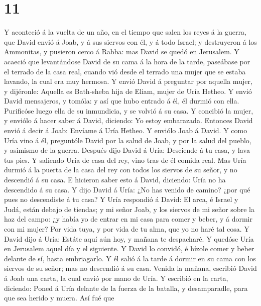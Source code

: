 \hypertarget{section-10}{%
\section{11}\label{section-10}}

 Y aconteció á la vuelta de un año, en el tiempo que salen
los reyes á la guerra, que David envió á Joab, y á sus siervos con él, y
á todo Israel; y destruyeron á los Ammonitas, y pusieron cerco á Rabba:
mas David se quedó en Jerusalem.  Y acaeció que levantándose
David de su cama á la hora de la tarde, paseábase por el terrado de la
casa real, cuando vió desde el terrado una mujer que se estaba lavando,
la cual era muy hermosa.  Y envió David á preguntar por
aquella mujer, y dijéronle: Aquella es Bath-sheba hija de Eliam, mujer
de Uría Hetheo.  Y envió David mensajeros, y tomóla: y así
que hubo entrado á él, él durmió con ella. Purificóse luego ella de su
inmundicia, y se volvió á su casa.  Y concibió la mujer, y
enviólo á hacer saber á David, diciendo: Yo estoy embarazada.
 Entonces David envió á decir á Joab: Envíame á Uría Hetheo.
Y enviólo Joab á David.  Y como Uría vino á él, preguntóle
David por la salud de Joab, y por la salud del pueblo, y asimismo de la
guerra.  Después dijo David á Uría: Desciende á tu casa, y
lava tus pies. Y saliendo Uría de casa del rey, vino tras de él comida
real.  Mas Uría durmió á la puerta de la casa del rey con
todos los siervos de su señor, y no descendió á su casa.  E
hicieron saber esto á David, diciendo: Uría no ha descendido á su casa.
Y dijo David á Uría: ¿No has venido de camino? ¿por qué pues no
descendiste á tu casa?  Y Uría respondió á David: El arca,
é Israel y Judá, están debajo de tiendas; y mi señor Joab, y los siervos
de mi señor sobre la haz del campo: ¿y había yo de entrar en mi casa
para comer y beber, y á dormir con mi mujer? Por vida tuya, y por vida
de tu alma, que yo no haré tal cosa.  Y David dijo á Uría:
Estáte aquí aún hoy, y mañana te despacharé. Y quedóse Uría en Jerusalem
aquel día y el siguiente.  Y David lo convidó, é hízole
comer y beber delante de sí, hasta embriagarlo. Y él salió á la tarde á
dormir en su cama con los siervos de su señor; mas no descendió á su
casa.  Venida la mañana, escribió David á Joab una carta,
la cual envió por mano de Uría.  Y escribió en la carta,
diciendo: Poned á Uría delante de la fuerza de la batalla, y
desamparadle, para que sea herido y muera.  Así fué que
